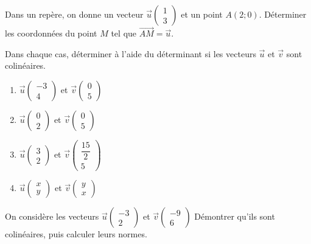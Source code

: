 \exo
Dans un repère, on donne un vecteur $\overrightarrow{u} \left( \begin{array}{c}
1\\
3
\end{array} \right)$ et un point $A(2;0)$. Déterminer les coordonnées du point $M$ tel que $\overrightarrow{AM}=\overrightarrow{u}$.

\exo
Dans chaque cas, déterminer à l'aide du déterminant si les vecteurs $\overrightarrow{u}$ et $\overrightarrow{v}$ sont colinéaires.

\begin{enumerate}
\item  $\overrightarrow{u} \left( \begin{array}{c}
-3\\
4
\end{array} \right)$ et $\overrightarrow{v} \left( \begin{array}{c}
0\\
5
\end{array} \right)$

\item  $\overrightarrow{u} \left( \begin{array}{c}
0\\
2
\end{array} \right)$ et $\overrightarrow{v} \left( \begin{array}{c}
0\\
5
\end{array} \right)$



\item  $\overrightarrow{u} \left( \begin{array}{c}
3\\
2
\end{array} \right)$ et $\overrightarrow{v} \left( \begin{array}{c}
\dfrac{15}{2}\\
5
\end{array} \right)$

\item  $\overrightarrow{u} \left( \begin{array}{c}
x\\
y
\end{array} \right)$ et $\overrightarrow{v} \left( \begin{array}{c}
y\\
x
\end{array} \right)$

\end{enumerate}
\exo
On considère les vecteurs  $\overrightarrow{u} \left( \begin{array}{c}
-3\\
2
\end{array} \right)$ et $\overrightarrow{v} \left( \begin{array}{c}
 -9\\
6
\end{array} \right)$
Démontrer qu'ils sont colinéaires, puis calculer leurs normes.

